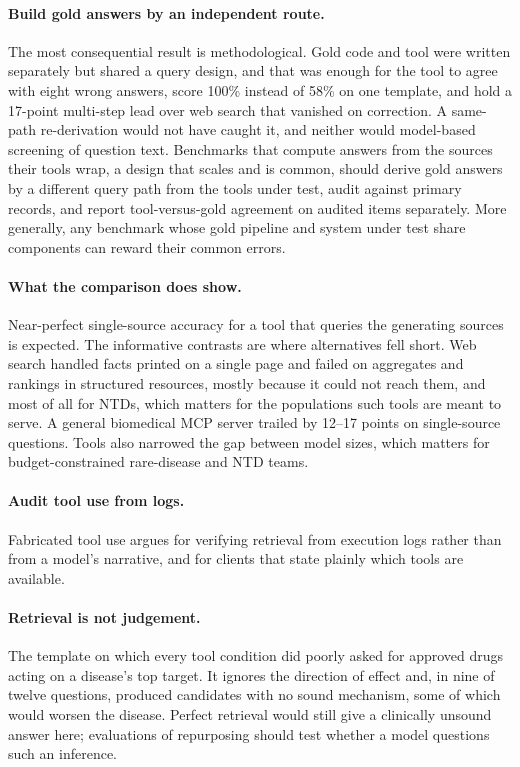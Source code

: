 \documentclass[11pt]{article}
\begin{document}
\paragraph{Build gold answers by an independent route.} The most consequential result is methodological. Gold code and tool were written separately but shared a query design, and that was enough for the tool to agree with eight wrong answers, score 100\% instead of 58\% on one template, and hold a 17-point multi-step lead over web search that vanished on correction. A same-path re-derivation would not have caught it, and neither would model-based screening of question text. Benchmarks that compute answers from the sources their tools wrap, a design that scales and is common, should derive gold answers by a different query path from the tools under test, audit against primary records, and report tool-versus-gold agreement on audited items separately. More generally, any benchmark whose gold pipeline and system under test share components can reward their common errors.

\paragraph{What the comparison does show.} Near-perfect single-source accuracy for a tool that queries the generating sources is expected. The informative contrasts are where alternatives fell short. Web search handled facts printed on a single page and failed on aggregates and rankings in structured resources, mostly because it could not reach them, and most of all for NTDs, which matters for the populations such tools are meant to serve. A general biomedical MCP server trailed by 12--17 points on single-source questions. Tools also narrowed the gap between model sizes, which matters for budget-constrained rare-disease and NTD teams.

\paragraph{Audit tool use from logs.} Fabricated tool use argues for verifying retrieval from execution logs rather than from a model's narrative, and for clients that state plainly which tools are available.

\paragraph{Retrieval is not judgement.} The template on which every tool condition did poorly asked for approved drugs acting on a disease's top target. It ignores the direction of effect and, in nine of twelve questions, produced candidates with no sound mechanism, some of which would worsen the disease. Perfect retrieval would still give a clinically unsound answer here; evaluations of repurposing should test whether a model questions such an inference.
\end{document}
